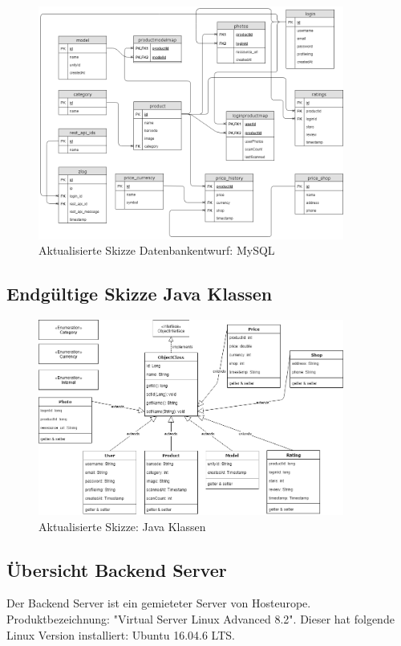 \documentclass{scrartcl}
\begin{document}
\begin{figure}[h]
\centering
\includegraphics[width=380px]{img/Skizze_Datenbank_2.png}
\caption{Aktualisierte Skizze Datenbankentwurf: MySQL}
\end{figure}

\newpage

\subsection{Endgültige Skizze Java Klassen}

\begin{figure}[h]
\centering
\includegraphics[width=380px]{img/Skizze_Java_New.png}
\caption{Aktualisierte Skizze: Java Klassen}
\end{figure}

\subsection{Übersicht Backend Server}

Der Backend Server ist ein gemieteter Server von Hosteurope. \newline
Produktbezeichnung: "Virtual Server Linux Advanced 8.2". \newline
Dieser hat folgende Linux Version installiert: Ubuntu 16.04.6 LTS. \newline \newline
\end{document}
